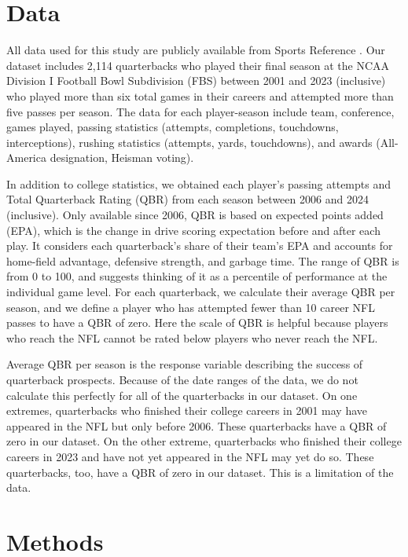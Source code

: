\documentclass{article}
\begin{document}
\section{Data}
\label{sec:data}

All data used for this study are publicly available from Sports Reference \citep{sports_reference_sports_2025}. Our dataset includes 2,114 quarterbacks who played their final season at the NCAA Division I Football Bowl Subdivision (FBS) between 2001 and 2023 (inclusive) who played more than six total games in their careers and attempted more than five passes per season. The data for each player-season include team, conference, games played, passing statistics (attempts, completions, touchdowns, interceptions), rushing statistics (attempts, yards, touchdowns), and awards (All-America designation, Heisman voting).

In addition to college statistics, we obtained each player's passing attempts and Total Quarterback Rating (QBR) \citep{burke_how_2016} from each season between 2006 and 2024 (inclusive). Only available since 2006, QBR is based on expected points added (EPA), which is the change in drive scoring expectation before and after each play. It considers each quarterback's share of their team's EPA and accounts for home-field advantage, defensive strength, and garbage time. The range of QBR is from 0 to 100, and \citet{burke_how_2016} suggests thinking of it as a percentile of performance at the individual game level. For each quarterback, we calculate their average QBR per season, and we define a player who has attempted fewer than 10 career NFL passes to have a QBR of zero. Here the scale of QBR is helpful because players who reach the NFL cannot be rated below players who never reach the NFL.

Average QBR per season is the response variable describing the success of quarterback prospects. Because of the date ranges of the data, we do not calculate this perfectly for all of the quarterbacks in our dataset. On one extremes, quarterbacks who finished their college careers in 2001 may have appeared in the NFL but only before 2006. These quarterbacks have a QBR of zero in our dataset. On the other extreme, quarterbacks who finished their college careers in 2023 and have not yet appeared in the NFL may yet do so. These quarterbacks, too, have a QBR of zero in our dataset. This is a limitation of the data.

\section{Methods}
\label{sec:methods}
\end{document}
